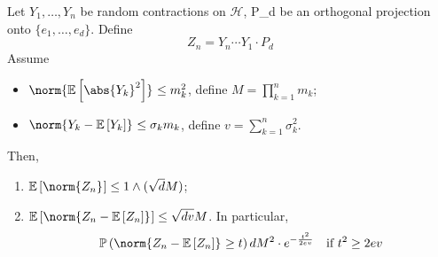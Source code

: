 \begin{thm}
  Let \( Y_1,\dots,Y_n \) be random contractions on \( \mathcal{H} \), P_d be an orthogonal projection onto \( \{e_1,\dots,e_d\} \). Define \[ Z_n=Y_n\cdots Y_1 \cdot P_d \]
  Assume 
  \begin{itemize}
    \item \( \norm{\mathbb{E}\left[ \abs{Y_k}^{2}\right]}_{} \leq m_k^{2} \), define \( M= \prod_{k=1}^{n}m_k \);
    \item \( \norm{Y_k-\mathbb{E}\left[Y_k\right]}_{} \leq \sigma_k m_k \), define \( v=\sum_{k=1}^{n} \sigma_k^{2} \).
  \end{itemize}
  Then, 
  \begin{enumerate}[1)]
    \item \( \mathbb{E}\left[\norm{Z_n}_{}\right] \leq 1 \wedge (\sqrt{d}M )\);
    \item \( \mathbb{E}\left[\norm{Z_n-\mathbb{E}\left[Z_n\right]}_{}\right] \leq \sqrt{dv}M \).
      In particular,
      \[ \mathbb{P}\left(\norm{Z_n-\mathbb{E}\left[Z_n\right]}_{}\geq t\right) dM^{2} \cdot e^{- \frac{t^{2}}{2ev}} \quad \text{if \( t^{2} \geq 2ev \)} \]
  \end{enumerate}
  
\end{thm}

